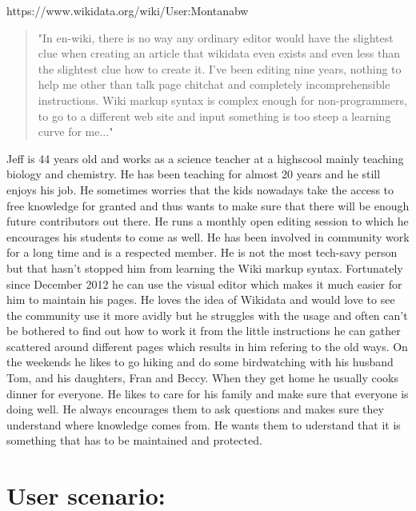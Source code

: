 \documentclass{article}
\begin{document}
\pagebreak

https://www.wikidata.org/wiki/User:Montanabw
\begin{quote}
"In en-wiki, there is no way any ordinary editor would have the slightest clue when creating an article that wikidata even exists and even less than the slightest clue how to create it. I've been editing nine years, nothing to help me other than talk page chitchat and completely incomprehensible instructions. Wiki markup syntax is complex enough for non-programmers, to go to a different web site and input something is too steep a learning curve for me..."
\end{quote}


Jeff is 44 years old and works as a science teacher at a highscool mainly teaching biology and chemistry. He has been teaching for almost 20 years and he still enjoys his job. He sometimes worries that the kids nowadays take the access to free knowledge for granted and thus wants to make sure that there will be enough future contributors out there. He runs a monthly open editing session to which he encourages his students to come as well. He has been involved in community work for a long time and is a respected member. He is not the most tech-savy person but that hasn't stopped him from learning the Wiki markup syntax. Fortunately since December 2012 he can use the visual editor which makes it much easier for him to maintain his pages. He loves the idea of Wikidata and would love to see the community use it more avidly but he struggles with the usage and often can't be bothered to find out how to work it from the little instructions he can gather scattered around different pages which results in him refering to the old ways.
On the weekends he likes to go hiking and do some birdwatching with his husband Tom, and his daughters, Fran and Beccy. When they get home he usually cooks dinner for everyone. He likes to care for his family and make sure that everyone is doing well. He always encourages them to ask questions and makes sure they understand where knowledge comes from. He wants them to uderstand that it is something that has to be maintained and protected. 

\section{User scenario:}
\end{document}
